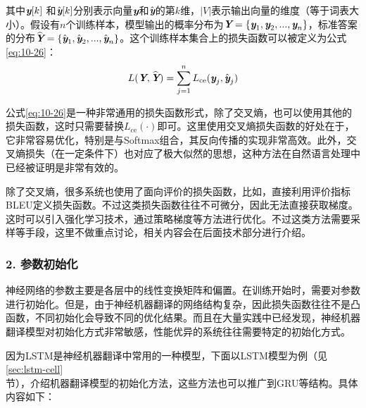 \vspace{-0.6em}
\noindent 其中$\textbf{\em y}[k]$ 和$\hat{\textbf{\em y}}[k]$分别表示向量$\textbf{\em y}$和$\hat{\textbf{\em y}}$的第$k$维，$|V|$表示输出向量的维度（等于词表大小）。假设有$n$个训练样本，模型输出的概率分布为$\textbf{\em Y} = \{ \textbf{\em y}_1,\textbf{\em y}_2,..., \textbf{\em y}_n \}$，标准答案的分布$\widehat{\textbf{\em Y}}=\{ \hat{\textbf{\em y}}_1, \hat{\textbf{\em y}}_2,...,\hat{\textbf{\em y}}_n \}$。这个训练样本集合上的损失函数可以被定义为公式\eqref{eq:10-26}：
\begin{eqnarray}
L(\textbf{\em Y},\widehat{\textbf{\em Y}}) = \sum_{j=1}^n L_{\textrm{ce}}(\textbf{\em y}_j,\hat{\textbf{\em y}}_j)
\label{eq:10-26}
\end{eqnarray}

\parinterval 公式\eqref{eq:10-26}是一种非常通用的损失函数形式，除了交叉熵，也可以使用其他的损失函数，这时只需要替换$L_{\textrm{ce}} (\cdot)$即可。这里使用交叉熵损失函数的好处在于，它非常容易优化，特别是与Softmax组合，其反向传播的实现非常高效。此外，交叉熵损失（在一定条件下）也对应了极大似然的思想，这种方法在自然语言处理中已经被证明是非常有效的。

\parinterval 除了交叉熵，很多系统也使用了面向评价的损失函数，比如，直接利用评价指标BLEU定义损失函数。不过这类损失函数往往不可微分，因此无法直接获取梯度。这时可以引入强化学习技术，通过策略梯度等方法进行优化。不过这类方法需要采样等手段，这里不做重点讨论，相关内容会在后面技术部分进行介绍。

\vspace{-1em}
\subsubsection{2. 参数初始化}

\parinterval 神经网络的参数主要是各层中的线性变换矩阵和偏置。在训练开始时，需要对参数进行初始化。但是，由于神经机器翻译的网络结构复杂，因此损失函数往往不是凸函数，不同初始化会导致不同的优化结果。而且在大量实践中已经发现，神经机器翻译模型对初始化方式非常敏感，性能优异的系统往往需要特定的初始化方式。

\parinterval 因为LSTM是神经机器翻译中常用的一种模型，下面以LSTM模型为例（见\ref{sec:lstm-cell}\\ 节），介绍机器翻译模型的初始化方法，这些方法也可以推广到GRU等结构。具体内容如下：

